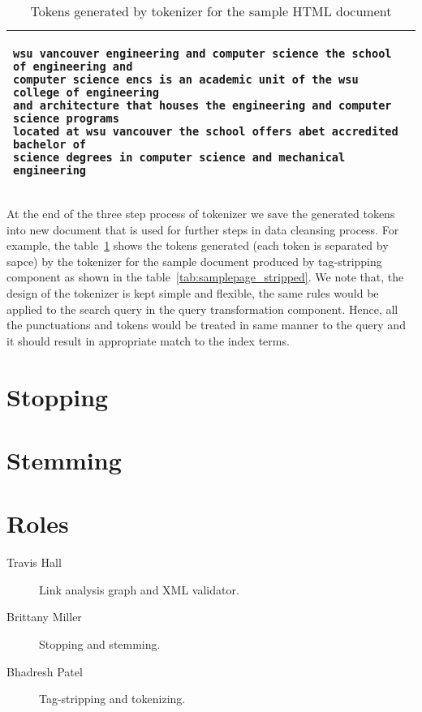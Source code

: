\documentclass[letterpaper,11pt,twoside]{article}
\begin{document}
\begin{table}[htb]
\centering
\begin{tabular}{|p{\textwidth}|}
\hline
\begin{verbatim}
wsu vancouver engineering and computer science the school of engineering and
computer science encs is an academic unit of the wsu college of engineering
and architecture that houses the engineering and computer science programs
located at wsu vancouver the school offers abet accredited bachelor of
science degrees in computer science and mechanical engineering
\end{verbatim}\\
\hline
\end{tabular}
\caption{Tokens generated by tokenizer for the sample HTML document}
\label{tab:samplepage_tokenized}
\end{table}

At the end of the three step process of tokenizer we save the generated tokens into new document that is used for further steps in data cleansing process. For example, the table~\ref{tab:samplepage_tokenized} shows the tokens generated (each token is separated by sapce) by the tokenizer for the sample document produced by tag-stripping component as shown in the table~\ref{tab:samplepage_stripped}. We note that, the design of the tokenizer is kept simple and flexible, the same rules would be applied to the search query in the query transformation component. Hence, all the punctuations and tokens would be treated in same manner to the query and it should result in appropriate match to the index terms. 

\section{Stopping}

\section{Stemming}


\section{Roles}
\begin{description}
 \item[Travis Hall] Link analysis graph and XML validator.
 \item[Brittany Miller] Stopping and stemming.
 \item[Bhadresh Patel] Tag-stripping and tokenizing.
\end{description}
\end{document}
